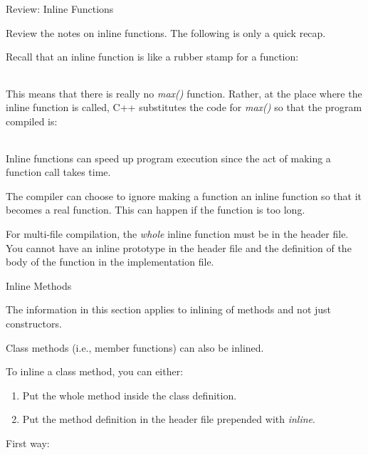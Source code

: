 \documentclass[
]{article}
\providecommand{\tightlist}{%
  \setlength{\itemsep}{0pt}\setlength{\parskip}{0pt}}
\begin{document}
Review: Inline Functions

Review the notes on inline functions. The following is only a quick
recap.

Recall that an inline function is like a rubber stamp for a function:

\begin{longtable}[]{@{}@{}}
\toprule
\endhead
\bottomrule
\end{longtable}

This means that there is really no \emph{max()} function. Rather, at the
place where the inline function is called, C++ substitutes the code for
\emph{max()} so that the program compiled is:

\begin{longtable}[]{@{}@{}}
\toprule
\endhead
\bottomrule
\end{longtable}

Inline functions can speed up program execution since the act of making
a function call takes time.

The compiler can choose to ignore making a function an inline function
so that it becomes a real function. This can happen if the function is
too long.

For multi-file compilation, the \emph{whole} inline function must be in
the header file. You cannot have an inline prototype in the header file
and the definition of the body of the function in the implementation
file.

Inline Methods

The information in this section applies to inlining of methods and not
just constructors.

Class methods (i.e., member functions) can also be inlined.

To inline a class method, you can either:

\begin{enumerate}
\def\labelenumi{\arabic{enumi}.}
\tightlist
\item
  Put the whole method inside the class definition.
\item
  Put the method definition in the header file prepended with
  \emph{inline}.
\end{enumerate}

First way:

\begin{longtable}[]{@{}@{}}
\toprule
\endhead
\bottomrule
\end{longtable}

\begin{longtable}[]{@{}@{}}
\toprule
\endhead
\bottomrule
\end{longtable}
\end{document}

